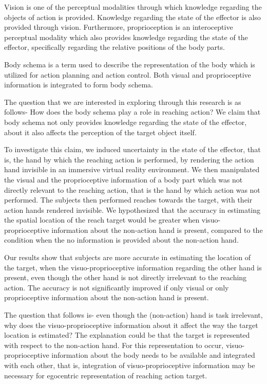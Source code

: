 Vision is one of the perceptual modalities through which knowledge regarding the objects of action is provided. Knowledge regarding the state of the effector is also provided through vision. Furthermore, proprioception is an interoceptive perceptual modality which also provides knowledge regarding the state of the effector, specifically regarding the relative positions of the body parts.
\cite{wong2014multimodality}

Body schema is a term used to describe the representation of the body which is utilized for action planning and action control. Both visual and proprioceptive information is integrated to form body schema.

The question that we are interested in exploring through this research is as follows- How does the body schema play a role in reaching action? We claim that body schema not only provides knowledge regarding the state of the effector, about it also affects the perception of the target object itself. 

To investigate this claim, we induced uncertainty in the state of the effector, that is, the hand by which the reaching action is performed, by rendering the action hand invisible in an immersive virtual reality environment. We then manipulated the visual and the proprioceptive information of a body part which was not directly relevant to the reaching action, that is the hand by which action was not performed. The subjects then performed reaches towards the target, with their action hands rendered invisible. We hypothesized that the accuracy in estimating the spatial location of the reach target would be greater when visuo-proprioceptive information about the non-action hand is present, compared to the condition when the no information is provided about the non-action hand.  

Our results show that subjects are more accurate in estimating the location of the target, when the visuo-proprioceptive information regarding the other hand is present, even though the other hand is not directly irrelevant to the reaching action. The accuracy is not significantly improved if only visual or only proprioceptive information about the non-action hand is present. 

The question that follows is- even though the (non-action) hand is task irrelevant, why does the visuo-proprioceptive information about it affect the way the target location is estimated? The explanation could be that the target is represented with respect to the non-action hand. For this representation to occur, visuo-proprioceptive information about the body needs to be available and integrated with each other, that is, integration of visuo-proprioceptive information may be necessary for egocentric representation of reaching action target. 

